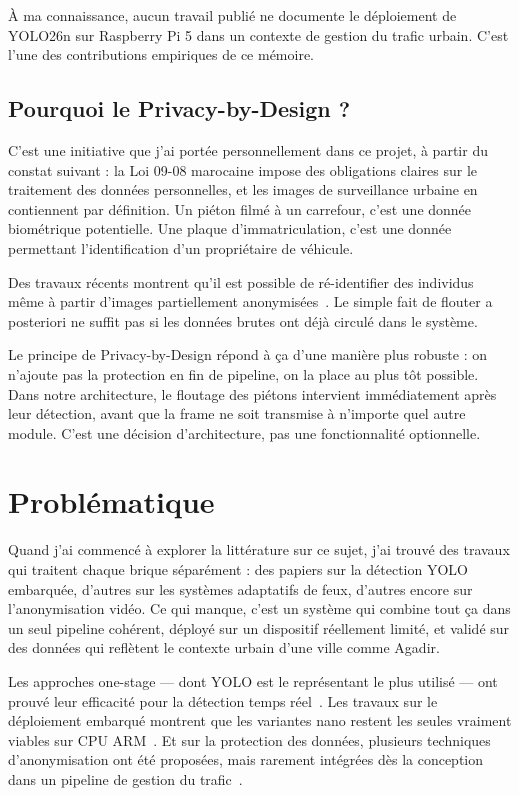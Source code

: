 À ma connaissance, aucun travail publié
ne documente le déploiement de YOLO26n
sur Raspberry Pi 5 dans un contexte de
gestion du trafic urbain. C'est l'une des
contributions empiriques de ce mémoire.

\subsection{Pourquoi le Privacy-by-Design ?}

C'est une initiative que j'ai portée
personnellement dans ce projet, à partir
du constat suivant : la Loi 09-08 marocaine
impose des obligations claires sur le
traitement des données personnelles, et
les images de surveillance urbaine en
contiennent par définition. Un piéton filmé
à un carrefour, c'est une donnée biométrique
potentielle. Une plaque d'immatriculation,
c'est une donnée permettant l'identification
d'un propriétaire de véhicule.

Des travaux récents montrent qu'il est
possible de ré-identifier des individus
même à partir d'images partiellement
anonymisées~\cite{razi2025, jeremiah2024}.
Le simple fait de flouter a posteriori
ne suffit pas si les données brutes ont
déjà circulé dans le système.

Le principe de Privacy-by-Design répond
à ça d'une manière plus robuste : on
n'ajoute pas la protection en fin de
pipeline, on la place au plus tôt possible.
Dans notre architecture, le floutage des
piétons intervient immédiatement après
leur détection, avant que la frame ne
soit transmise à n'importe quel autre
module. C'est une décision d'architecture,
pas une fonctionnalité optionnelle.

\section{Problématique}

Quand j'ai commencé à explorer la littérature
sur ce sujet, j'ai trouvé des travaux qui
traitent chaque brique séparément : des papiers
sur la détection YOLO embarquée, d'autres
sur les systèmes adaptatifs de feux, d'autres
encore sur l'anonymisation vidéo. Ce qui
manque, c'est un système qui combine tout
ça dans un seul pipeline cohérent, déployé
sur un dispositif réellement limité, et
validé sur des données qui reflètent le
contexte urbain d'une ville comme Agadir.

Les approches one-stage — dont YOLO est
le représentant le plus utilisé — ont
prouvé leur efficacité pour la détection
temps réel~\cite{ramos2025}. Les travaux
sur le déploiement embarqué montrent que
les variantes nano restent les seules
vraiment viables sur CPU ARM~\cite{wang2025,
sapkota2025}. Et sur la protection des
données, plusieurs techniques d'anonymisation
ont été proposées, mais rarement intégrées
dès la conception dans un pipeline de
gestion du trafic~\cite{jeremiah2024,
razi2025}.

